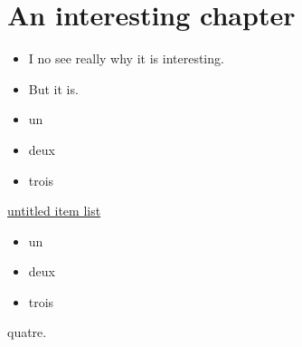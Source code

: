 \chapter{An interesting chapter}
\label{s:1}
\begin{itemize}
\item I no see really why it is interesting.
\item But it is.
\end{itemize}
\hypertarget{label1}{}\begin{itemize}
\item un
\item deux
\item trois
\end{itemize}
\hyperlink{label1}{untitled item list}

\begin{itemize}
\item un
\item deux
\item trois
\end{itemize}
quatre.

